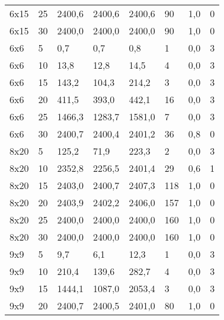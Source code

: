 \begin{table}[]
\begin{tabular}{@{}llllllll@{}}
		6x15    & 25            & 2400,6        & 2400,6      & 2400,6      & 90         & 1,0     & 0          \\
		6x15    & 30            & 2400,0        & 2400,0      & 2400,0      & 90         & 1,0     & 0          \\
		6x6     & 5             & 0,7           & 0,7         & 0,8         & 1          & 0,0     & 3          \\
		6x6     & 10            & 13,8          & 12,8        & 14,5        & 4          & 0,0     & 3          \\
		6x6     & 15            & 143,2         & 104,3       & 214,2       & 3          & 0,0     & 3          \\
		6x6     & 20            & 411,5         & 393,0       & 442,1       & 16         & 0,0     & 3          \\
		6x6     & 25            & 1466,3        & 1283,7      & 1581,0      & 7          & 0,0     & 3          \\
		6x6     & 30            & 2400,7        & 2400,4      & 2401,2      & 36         & 0,8     & 0          \\
		8x20    & 5             & 125,2         & 71,9        & 223,3       & 2          & 0,0     & 3          \\
		8x20    & 10            & 2352,8        & 2256,5      & 2401,4      & 29         & 0,6     & 1          \\
		8x20    & 15            & 2403,0        & 2400,7      & 2407,3      & 118        & 1,0     & 0          \\
		8x20    & 20            & 2403,9        & 2402,2      & 2406,0      & 157        & 1,0     & 0          \\
		8x20    & 25            & 2400,0        & 2400,0      & 2400,0      & 160        & 1,0     & 0          \\
		8x20    & 30            & 2400,0        & 2400,0      & 2400,0      & 160        & 1,0     & 0          \\
		9x9     & 5             & 9,7           & 6,1         & 12,3        & 1          & 0,0     & 3          \\
		9x9     & 10            & 210,4         & 139,6       & 282,7       & 4          & 0,0     & 3          \\
		9x9     & 15            & 1444,1        & 1087,0      & 2053,4      & 3          & 0,0     & 3          \\
		9x9     & 20            & 2400,7        & 2400,5      & 2401,0      & 80         & 1,0     & 0          \\

\end{tabular}
\end{table}
